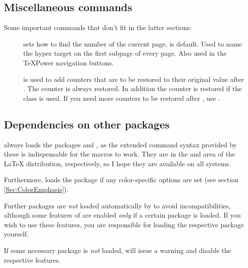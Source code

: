 \documentclass[12pt]{scrartcl}
\let\newslide=\relax
\begin{document}
\newslide

\subsection{Miscellaneous commands}\label{Sec:MiscCmd}
Some important commands that don't fit in the latter sections:
\begin{description}
\item[]
  sets how to find the number of the current page,  is default.
  Used to name the hyper target on the first subpage of every page. Also used in the
  TeXPower navigation buttons.
\item[]
  is used to add counters that are to be restored to their original value after . The 
  counter is always restored. In addition the  counter is restored if the  class is used. If
  you need more counters to be restored after , use .
\end{description}

\newslide

\subsection{Dependencies on other packages}
 always loads the packages  and , as the extended command syntax provided by
these is indispensable for the macros to work. They are in the  and  area of the \LaTeX{}
distribution, respectively, so I hope they are available on all systems.

Furthermore,  loads the package  if any color-specific options are set (see section
\ref{Sec:ColorEmphasis}).

Further packages are \emph{not} loaded automatically by  to avoid incompatibilities, although some
features of  are enabled \emph{only} if a certain package is loaded. If you wish to use these features,
you are responsible for loading the respective package yourself.

If some necessary package is \emph{not} loaded,  will issue a warning and disable the respective
features.
\end{document}
